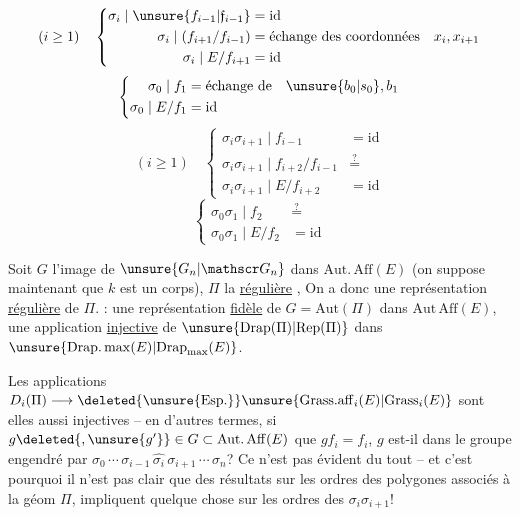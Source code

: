 \[
(i\geq1)\quad\left\{\begin{aligned}
\sigma_i\mid\unsure{f_{i-1}|\mathfrak f_{i-1}}&=\mathrm{id}\\
\sigma_i\mid(f_{i+1}/f_{i-1})&=\text{échange des coordonnées}\quad x_i,x_{i+1}\\
\sigma_i\mid E/f_{i+1}&=\mathrm{id}
\end{aligned}\right.
\]
\[
\left\{\begin{aligned}
\sigma_0\mid f_1&=\text{échange de}\quad\unsure{b_0|s_0},b_1\\
\sigma_0\mid E/f_1&=\mathrm{id}
\end{aligned}\right.
\]
\[
(i\geq1)\quad\left\{\begin{aligned}
\sigma_i\sigma_{i+1}\mid f_{i-1}&=\mathrm{id}\\
\sigma_i\sigma_{i+1}\mid f_{i+2}/f_{i-1}&\overset{?}{=}\\
\sigma_i\sigma_{i+1}\mid E/f_{i+2}&=\mathrm{id}
\end{aligned}\right.
\]
\[
\left\{\begin{aligned}
\sigma_0\sigma_1\mid f_2&\overset{?}{=}\\
\sigma_0\sigma_1\mid E/f_2&=\mathrm{id}
\end{aligned}\right.
\]

Soit $G$ l'image de $\unsure{G_n|\mathscr G_n}$ dans $\mathrm{Aut.\,Aff}(E)$ (on suppose maintenant que $k$ est un corps), $\Pi$ la  \uline{régulière}  , On a donc une représentation \uline{régulière} de $\Pi$. : une représentation \uline{fidèle} de $G=\mathrm{Aut}(\Pi)$ dans $\mathrm{Aut\,Aff}(E)$,  une application \uline{injective} de $\unsure{\mathrm{Drap}(\Pi)|\mathrm{Rep}(\Pi)}$ dans $\unsure{\mathrm{Drap.\,max}(E)|\mathrm{Drap}_{\max}(E)}$.

Les applications $D_i(\Pi)\longrightarrow\deleted{\unsure{\mathrm{Esp.}}}\unsure{\mathrm{Grass.aff}_i(E)|\mathrm{Grass}_i(E)}$ sont elles aussi injectives -- en d'autres termes, si  $g\deleted{,\unsure{g'}}\in G\subset\mathrm{Aut.\,Aff}(E)$
 que 
$gf_i=f_i$, $g$ est-il dans le groupe engendré par $\sigma_0\,\cdots\,\sigma_{i-1}\,\widehat{\sigma_i}\,\sigma_{i+1}\,\cdots\,\sigma_n$? Ce n'est pas évident du tout -- et c'est pourquoi il n'est pas clair que des résultats sur les  ordres des polygones associés à la  géom  $\Pi$, impliquent quelque chose sur les ordres des $\sigma_i\sigma_{i+1}$!

